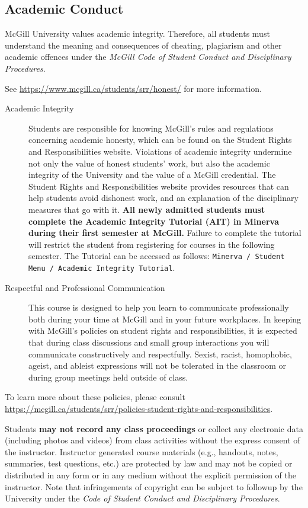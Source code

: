 \documentclass{article}
\begin{document}
\newpage

\subsection{Academic Conduct}

McGill University values academic integrity. Therefore, all students
must understand the meaning and consequences of cheating, plagiarism
and other academic offences under the {\em McGill Code of Student Conduct
and Disciplinary Procedures}.

See \url{https://www.mcgill.ca/students/srr/honest/} for more
information.

\begin{description} 
\item[Academic Integrity]{Students are responsible for knowing
  McGill's rules and regulations concerning academic honesty, which
  can be found on the Student Rights and Responsibilities
  website. Violations of academic integrity undermine not only the
  value of honest students' work, but also the academic integrity of
  the University and the value of a McGill credential. The Student
  Rights and Responsibilities website provides resources that can help
  students avoid dishonest work, and an explanation of the
  disciplinary measures that go with it. 
  {\bf All newly admitted students must complete the Academic
    Integrity Tutorial (AIT) in Minerva during their first semester at
    McGill.} Failure to complete the tutorial will restrict the
  student from registering for courses in the following semester. The
  Tutorial can be accessed as follows: \texttt{Minerva / Student Menu
    / Academic Integrity Tutorial}.}
\item[Respectful and Professional Communication]{This course is
  designed to help you learn to communicate professionally both during
  your time at McGill and in your future workplaces. In keeping with
  McGill's policies on student rights and responsibilities, it is
  expected that during class discussions and small group interactions
  you will communicate constructively and respectfully. Sexist,
  racist, homophobic, ageist, and ableist expressions will not be
  tolerated in the classroom or during group meetings held outside of
  class.}
 \end{description}

To learn more about these policies, please consult 
\url{https://mcgill.ca/students/srr/policies-student-rights-and-responsibilities}.

Students {\bf may not record any class proceedings} or collect any
electronic data (including photos and videos) from class activities
without the express consent of the instructor. Instructor generated
course materials (e.g., handouts, notes, summaries, test questions,
etc.) are protected by law and may not be copied or distributed in any
form or in any medium without the explicit permission of the
instructor. Note that infringements of copyright can be subject to
followup by the University under the {\em Code of Student Conduct and
Disciplinary Procedures}.
\end{document}
